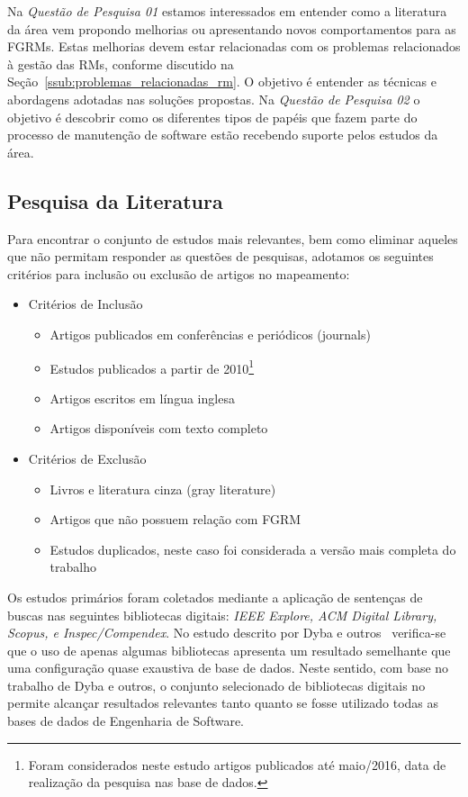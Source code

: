 Na \textit{Questão de Pesquisa 01} estamos interessados em entender como a
literatura da área vem propondo melhorias ou apresentando novos comportamentos
para as FGRMs. Estas melhorias devem estar relacionadas com os problemas
relacionados à gestão das RMs, conforme discutido na
Seção~\ref{ssub:problemas_relacionadas_rm}. O objetivo é entender as técnicas e
abordagens adotadas nas soluções propostas. Na \textit{Questão de Pesquisa 02} o
objetivo é descobrir como os diferentes tipos de papéis que fazem parte do
processo de manutenção de software estão recebendo suporte pelos estudos da
área.

\subsection{Pesquisa da Literatura}
\label{subsec:map-pesquisa-literatura}

Para encontrar o conjunto de estudos mais relevantes, bem como eliminar aqueles
que não permitam responder as questões de pesquisas, adotamos os seguintes
critérios para inclusão ou exclusão de artigos no mapeamento:

\begin{itemize}
	\item Critérios de Inclusão
		\begin{itemize}
			\item Artigos
				publicados em conferências e periódicos (journals)
			\item Estudos
				publicados a partir de 2010\footnote{Foram considerados neste
					estudo artigos publicados até maio/2016, data de realização
					da pesquisa nas base de dados.}
			\item Artigos escritos em
				língua inglesa
			\item Artigos disponíveis com texto
				completo
		\end{itemize}
	\item Critérios de Exclusão
		\begin{itemize}
			\item Livros e literatura cinza (gray literature)
			\item Artigos que não possuem relação com FGRM
			\item Estudos duplicados, neste caso foi considerada a versão mais
				completa do trabalho
		\end{itemize}
\end{itemize}

Os estudos primários foram coletados mediante a aplicação de sentenças de buscas
nas seguintes bibliotecas digitais: \textit{IEEE Explore, ACM Digital Library,
	Scopus, e Inspec/Compendex}. No estudo descrito por Dyba e
outros~\cite{dybaa2007applying} verifica-se que o uso de apenas algumas
bibliotecas apresenta um resultado semelhante que uma configuração quase
exaustiva de base de dados. Neste sentido, com base no trabalho de Dyba e
outros, o conjunto selecionado de bibliotecas digitais no permite alcançar
resultados relevantes tanto quanto se fosse utilizado todas as bases de dados de
Engenharia de Software.

